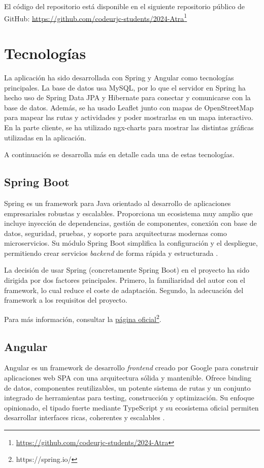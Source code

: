El código del repositorio está disponible en el siguiente repositorio público de GitHub: \href{https://github.com/codeurjc-students/2024-Atra}{https://github.com/codeurjc-students/2024-Atra}\footnote{\url{https://github.com/codeurjc-students/2024-Atra}}

\section{Tecnologías}
La aplicación ha sido desarrollada con Spring y Angular como tecnologías principales. La base de datos usa MySQL, por lo que el servidor en Spring ha hecho uso de Spring Data JPA y Hibernate para conectar y comunicarse con la base de datos. Además, se ha usado Leaflet junto con mapas de OpenStreetMap para mapear las rutas y actividades y poder mostrarlas en un mapa interactivo. En la parte cliente, se ha utilizado ngx-charts para mostrar las distintas gráficas utilizadas en la aplicación.

\noindent A continuación se desarrolla más en detalle cada una de estas tecnologías.

\subsection{Spring Boot}
Spring es un framework para Java orientado al desarrollo de aplicaciones empresariales robustas y escalables. Proporciona un ecosistema muy amplio que incluye inyección de dependencias, gestión de componentes, conexión con base de datos, seguridad, pruebas, y soporte para arquitecturas modernas como microservicios. Su módulo Spring Boot simplifica la configuración y el despliegue, permitiendo crear servicios \textit{backend} de forma rápida y estructurada \cite{spring}.

La decisión de usar Spring (concretamente Spring Boot) en el proyecto ha sido dirigida por dos factores principales. Primero, la familiaridad del autor con el framework, lo cual reduce
el coste de adaptación. Segundo, la adecuación del framework a los requisitos del proyecto.

\noindent Para más información, consultar la \href{https://spring.io/}{\uline{página oficial}\footnote{\url{https://spring.io/}}}.


\subsection{Angular}
Angular es un framework de desarrollo \textit{frontend} creado por Google para construir aplicaciones web SPA con una arquitectura sólida y mantenible. Ofrece binding de datos, componentes reutilizables, un potente sistema de rutas y un conjunto integrado de herramientas para testing, construcción y optimización. Su enfoque opinionado, el tipado fuerte mediante TypeScript y su ecosistema oficial permiten desarrollar interfaces ricas, coherentes y escalables \cite{angular}.

